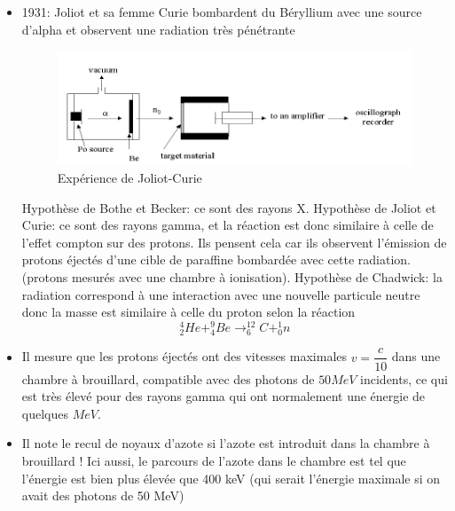     \begin{itemize}
        \item 1931: Joliot et sa femme Curie bombardent du Béryllium avec une source d'alpha et observent une radiation très pénétrante
        
    \begin{figure}[ht]
        \centering
        \includegraphics[scale=0.99]{Images1/joliotcurie.PNG}
        \caption{Expérience de Joliot-Curie}
    \end{figure}
    
    Hypothèse de Bothe et Becker: ce sont des rayons X. Hypothèse de Joliot et Curie: ce sont des rayons gamma, et la réaction est donc similaire à celle de l'effet compton sur des protons. Ils pensent cela car ils observent l'émission de protons éjectés d'une cible de paraffine bombardée avec cette radiation. (protons mesurés avec une chambre à ionisation). Hypothèse de Chadwick: la radiation correspond à une interaction avec une nouvelle particule neutre donc la masse est similaire à celle du proton selon la réaction 
        \[
            ^{4}_{2}He + ^{9}_{4}Be \rightarrow ^{12}_{6}C + ^{1}_{0}n 
        \]
    
    \item Il mesure que les protons éjectés ont des vitesses maximales $v=\dfrac{c}{10}$ dans une chambre à brouillard, compatible avec des photons de $50 MeV$ incidents, ce qui est très élevé pour des rayons gamma qui ont normalement une énergie de quelques $MeV$. 
    
    \item Il note le recul de noyaux d'azote si l'azote est introduit dans la chambre à brouillard ! Ici aussi, le parcours de l'azote dans le chambre est tel que l'énergie est bien plus élevée que 400 keV (qui serait l'énergie maximale si on avait des photons de 50 MeV)
    

\end{itemize}
